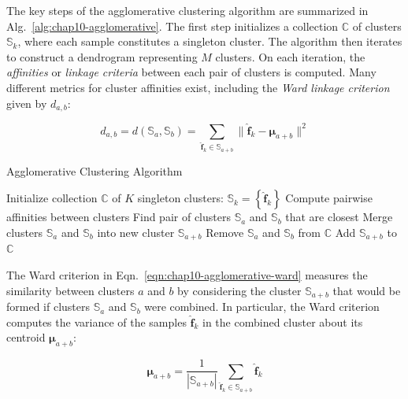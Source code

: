 The key steps of the agglomerative clustering algorithm are summarized in Alg.~\ref{alg:chap10-agglomerative}. The first step initializes a collection $\mathbb{C}$ of clusters $\mathbb{S}_{k}$, where each sample constitutes a singleton cluster. The algorithm then iterates to construct a dendrogram representing $M$ clusters. On each iteration, the \textit{affinities} or \textit{linkage criteria} between each pair of clusters is computed. Many different metrics for cluster affinities exist, including the \textit{Ward linkage criterion}~\cite{ward1963hierarchical} given by $d_{a,b}$:

\begin{equation}
\label{eqn:chap10-agglomerative-ward}
d_{a,b} = d\left(\mathbb{S}_{a}, \mathbb{S}_{b}\right) = \displaystyle\sum\limits_{\boldsymbol{\hat{f}}_{k} \in \mathbb{S}_{a+b}} \|\boldsymbol{\hat{f}}_{k} - \boldsymbol{\mu}_{a+b}\|^{2}
\end{equation}

\begin{algorithm}[h!]
\caption[Agglomerative Clustering Algorithm]{Agglomerative Clustering Algorithm}
\label{alg:chap10-agglomerative}
\begin{algorithmic}[1]
  \State Initialize collection $\mathbb{C}$ of $K$ singleton clusters: $\mathbb{S}_{k} = \left\{ \boldsymbol{\hat{f}}_{k} \right\}$
    \State Compute pairwise affinities between clusters 
    \State Find pair of clusters $\mathbb{S}_{a}$ and $\mathbb{S}_{b}$ that are closest %
    \State Merge clusters $\mathbb{S}_{a}$ and $\mathbb{S}_{b}$ into new cluster $\mathbb{S}_{a+b}$
    \State Remove $\mathbb{S}_{a}$ and $\mathbb{S}_{b}$ from $\mathbb{C}$
    \State Add $\mathbb{S}_{a+b}$ to $\mathbb{C}$
  \EndWhile
\end{algorithmic}
\end{algorithm}

\noindent The Ward criterion in Eqn.~\ref{eqn:chap10-agglomerative-ward} measures the similarity between clusters $a$ and $b$ by considering the cluster $\mathbb{S}_{a+b}$ that would be formed if clusters $\mathbb{S}_{a}$ and $\mathbb{S}_{b}$ were combined. In particular, the Ward criterion computes the variance of the samples $\boldsymbol{\hat{f}}_{k}$ in the combined cluster about its centroid $\boldsymbol{\mu}_{a+b}$:

\begin{equation}
\label{eqn:chap10-agglomerative-mean}
\boldsymbol{\mu}_{a+b} = \frac{1}{|\mathbb{S}_{a+b}|} \displaystyle\sum\limits_{\boldsymbol{\hat{f}}_{k} \in \mathbb{S}_{a+b}}  \boldsymbol{\hat{f}}_{k}
\end{equation}

